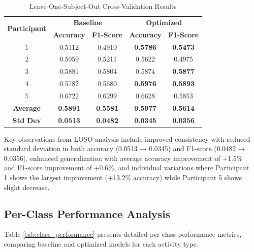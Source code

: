 \documentclass{iopconfser}
\begin{document}
\begin{table}[H]
\centering
\caption{Leave-One-Subject-Out Cross-Validation Results}
\label{tab:loso_results}
\begin{tabular}{ccccc}
\toprule
\multirow{2}{*}{\textbf{Participant}} & \multicolumn{2}{c}{\textbf{Baseline}} & \multicolumn{2}{c}{\textbf{Optimized}} \\
\cmidrule(lr){2-3} \cmidrule(lr){4-5}
& \textbf{Accuracy} & \textbf{F1-Score} & \textbf{Accuracy} & \textbf{F1-Score} \\
\midrule
1 & 0.5112 & 0.4910 & \textbf{0.5786} & \textbf{0.5473} \\
2 & 0.5959 & 0.5211 & 0.5622 & 0.4975 \\
3 & 0.5881 & 0.5804 & 0.5874 & \textbf{0.5877} \\
4 & 0.5782 & 0.5680 & \textbf{0.5976} & \textbf{0.5893} \\
5 & 0.6722 & 0.6299 & 0.6628 & 0.5853 \\
\midrule
\textbf{Average} & \textbf{0.5891} & \textbf{0.5581} & \textbf{0.5977} & \textbf{0.5614} \\
\textbf{Std Dev} & \textbf{0.0513} & \textbf{0.0482} & \textbf{0.0345} & \textbf{0.0356} \\
\bottomrule
\end{tabular}
\end{table}

Key observations from LOSO analysis include improved consistency with reduced standard deviation in both accuracy (0.0513 → 0.0345) and F1-score (0.0482 → 0.0356), enhanced generalization with average accuracy improvement of +1.5\% and F1-score improvement of +0.6\%, and individual variations where Participant 1 shows the largest improvement (+13.2\% accuracy) while Participant 5 shows slight decrease.

\subsection{Per-Class Performance Analysis}

Table \ref{tab:class_performance} presents detailed per-class performance metrics, comparing baseline and optimized models for each activity type.
\end{document}
